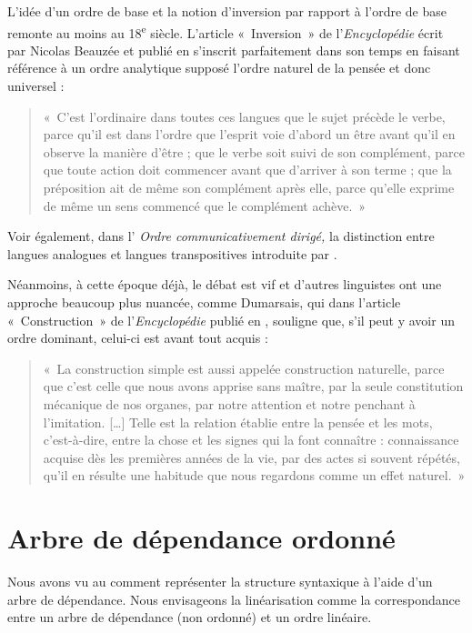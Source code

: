 {    L’idée d’un ordre de base et la notion d’inversion par rapport à l’ordre de base remonte au moins au 18\textsuperscript{e} siècle. L’article «~Inversion~» de l’\textit{Encyclopédie} écrit par Nicolas Beauzée et publié en \citeyear{Beauzée1765} s’inscrit parfaitement dans son temps en faisant référence à un ordre analytique supposé l’ordre naturel de la pensée et donc universel : 
    \begin{quote}«~C’est l’ordinaire dans toutes ces langues que le sujet précède le verbe, parce qu’il est dans l’ordre que l’esprit voie d’abord un être avant qu’il en observe la manière d’être ; que le verbe soit suivi de son complément, parce que toute action doit commencer avant que d’arriver à son terme ; que la préposition ait de même son complément après elle, parce qu’elle exprime de même un sens commencé que le complément achève.~»
    \end{quote}
    Voir également, dans l’ \textit{Ordre communicativement dirigé,} la distinction entre langues analogues et langues transpositives introduite par \citet{girard1747vrais}. 
    
    Néanmoins, à cette époque déjà, le débat est vif et d’autres linguistes ont une approche beaucoup plus nuancée, comme Dumarsais, qui dans l’article «~Construction~» de l’\textit{Encyclopédie} publié en \citeyear{Dumarsais1754}, souligne que, s’il peut y avoir un ordre dominant, celui-ci est avant tout acquis : 
    \begin{quote}
   «~La construction simple est aussi appelée construction naturelle, parce que c’est celle que nous avons apprise sans maître, par la seule constitution mécanique de nos organes, par notre attention et notre penchant à l’imitation. […] Telle est la relation établie entre la pensée et les mots, c’est-à-dire, entre la chose et les signes qui la font connaître : connaissance acquise dès les premières années de la vie, par des actes si souvent répétés, qu’il en résulte une habitude que nous regardons comme un effet naturel.~»
    \end{quote}
}
\section{Arbre de dépendance ordonné}\label{sec:3.5.9}

Nous avons vu au  comment représenter la structure syntaxique à l’aide d’un arbre de dépendance. Nous envisageons la linéarisation comme la correspondance entre un arbre de dépendance (non ordonné) et un ordre linéaire. 


